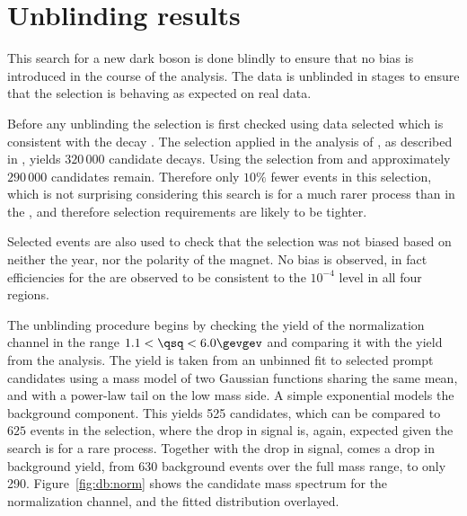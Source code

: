 \section{Unblinding results}

This search for a new dark boson is done blindly to ensure that no bias is introduced in the
course of the analysis.
The data is unblinded in stages to ensure that the selection is behaving as expected on real data.

Before any unblinding the selection is first checked using data selected which is
consistent with the decay \decay{\Bd}{\jpsi\Kstarz}.
The selection applied in the \sm analysis of \btokstrmumu, as described in
, yields $320\,000$ candidate decays.
Using the selection from  and approximately \approx$290\,000$
\decay{\Bd}{\jpsi\Kstarz} candidates remain.
Therefore only \approx$10\%$ fewer events in this selection, which is not surprising
considering this search is for a much rarer process than \decay{\Bd}{\Kstarz\mumu} in the \sm, and
therefore selection requirements are likely to be tighter.

Selected \decay{\Bd}{\jpsi\Kstarz} events are also used to check that the selection was not biased
based on neither the year, nor the polarity of the \lhcb magnet.
No bias is observed, in fact
efficiencies for the \uBDT are observed to be consistent to the $10^{-4}$ level in all four regions.

The unblinding procedure begins by checking the yield of the normalization channel
\btokstrmumu in the range $1.1<\qsq<6.0\gevgev$ and comparing it with the yield from the \sm
analysis.
The yield is taken from an unbinned fit to selected prompt \btokstrdb candidates using a mass model
of two Gaussian functions sharing the same mean, and with a power-law tail on the low mass side.
A simple exponential models the background component.
This yields 525 \Bd candidates, which can be compared to \approx$625$ events in the \sm selection,
where the drop in signal is, again, expected given the search is for a rare process.
Together with the drop in signal, comes a drop in background yield, from \approx$630$ background
events over the full mass range, to only 290.
Figure~\ref{fig:db:norm} shows the \Bd candidate mass spectrum for the normalization channel, and
the fitted distribution overlayed.

